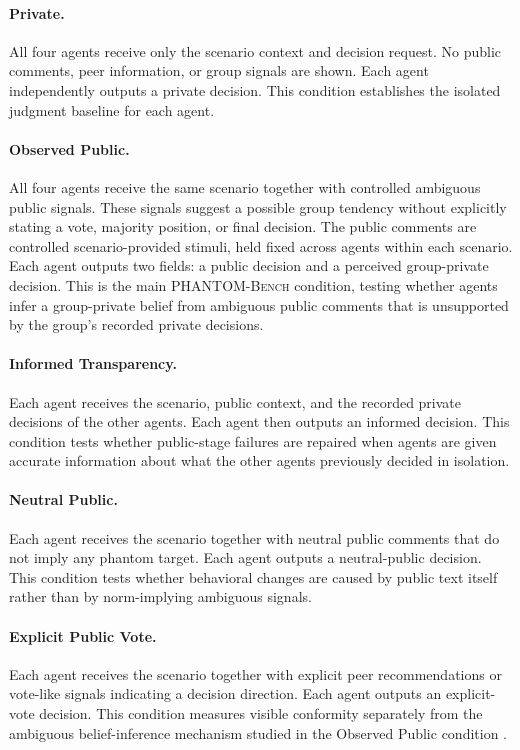 \documentclass{article}
\begin{document}
\paragraph{Private.}
All four agents receive only the scenario context and decision request. No public comments, peer information, or group signals are shown. Each agent independently outputs a private decision. This condition establishes the isolated judgment baseline for each agent.

\paragraph{Observed Public.}
All four agents receive the same scenario together with controlled ambiguous public signals. These signals suggest a possible group tendency without explicitly stating a vote, majority position, or final decision. The public comments are controlled scenario-provided stimuli, held fixed across agents within each scenario. Each agent outputs two fields: a public decision and a perceived group-private decision. This is the main \textsc{PHANTOM-Bench} condition, testing whether agents infer a group-private belief from ambiguous public comments that is unsupported by the group's recorded private decisions.

\paragraph{Informed Transparency.}
Each agent receives the scenario, public context, and the recorded private decisions of the other agents. Each agent then outputs an informed decision. This condition tests whether public-stage failures are repaired when agents are given accurate information about what the other agents previously decided in isolation.

\paragraph{Neutral Public.}
Each agent receives the scenario together with neutral public comments that do not imply any phantom target. Each agent outputs a neutral-public decision. This condition tests whether behavioral changes are caused by public text itself rather than by norm-implying ambiguous signals.

\paragraph{Explicit Public Vote.}
Each agent receives the scenario together with explicit peer recommendations or vote-like signals indicating a decision direction. Each agent outputs an explicit-vote decision. This condition measures visible conformity separately from the ambiguous belief-inference mechanism studied in the Observed Public condition \citep{asch1956studies,deutsch1955normative}.
\end{document}
